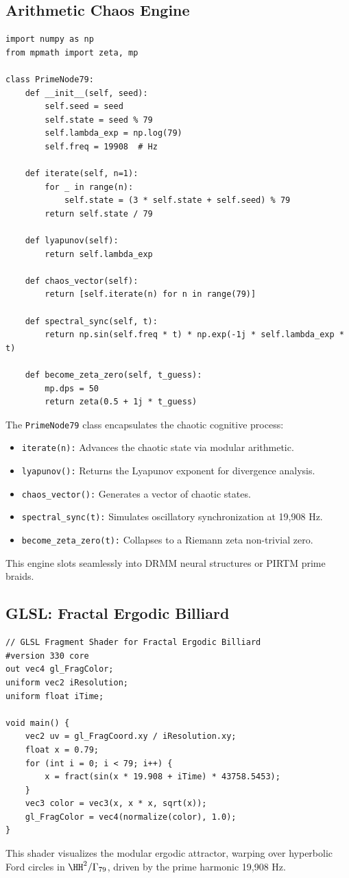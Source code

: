 \documentclass[12pt]{article}
\newcommand{\DRMM}{DRMM}
\newcommand{\PIRTM}{PIRTM}
\begin{document}
\subsection{Arithmetic Chaos Engine}
\begin{algorithm}
\caption{PrimeNode79 Engine}
\begin{lstlisting}
import numpy as np
from mpmath import zeta, mp

class PrimeNode79:
    def __init__(self, seed):
        self.seed = seed
        self.state = seed % 79
        self.lambda_exp = np.log(79)
        self.freq = 19908  # Hz

    def iterate(self, n=1):
        for _ in range(n):
            self.state = (3 * self.state + self.seed) % 79
        return self.state / 79

    def lyapunov(self):
        return self.lambda_exp

    def chaos_vector(self):
        return [self.iterate(n) for n in range(79)]

    def spectral_sync(self, t):
        return np.sin(self.freq * t) * np.exp(-1j * self.lambda_exp * t)

    def become_zeta_zero(self, t_guess):
        mp.dps = 50
        return zeta(0.5 + 1j * t_guess)
\end{lstlisting}
\end{algorithm}
The \texttt{PrimeNode79} class encapsulates the chaotic cognitive process:
\begin{itemize}
    \item \texttt{iterate(n):} Advances the chaotic state via modular arithmetic.
    \item \texttt{lyapunov():} Returns the Lyapunov exponent for divergence analysis.
    \item \texttt{chaos_vector():} Generates a vector of chaotic states.
    \item \texttt{spectral_sync(t):} Simulates oscillatory synchronization at 19,908 Hz.
    \item \texttt{become_zeta_zero(t):} Collapses to a Riemann zeta non-trivial zero.
\end{itemize}
This engine slots seamlessly into \DRMM{} neural structures or \PIRTM{} prime braids.

\subsection{GLSL: Fractal Ergodic Billiard}
\begin{lstlisting}
// GLSL Fragment Shader for Fractal Ergodic Billiard
#version 330 core
out vec4 gl_FragColor;
uniform vec2 iResolution;
uniform float iTime;

void main() {
    vec2 uv = gl_FragCoord.xy / iResolution.xy;
    float x = 0.79;
    for (int i = 0; i < 79; i++) {
        x = fract(sin(x * 19.908 + iTime) * 43758.5453);
    }
    vec3 color = vec3(x, x * x, sqrt(x));
    gl_FragColor = vec4(normalize(color), 1.0);
}
\end{lstlisting}
This shader visualizes the modular ergodic attractor, warping over hyperbolic Ford circles in $\HH^2 / \Gamma_{79}$, driven by the prime harmonic 19,908 Hz.
\end{document}
